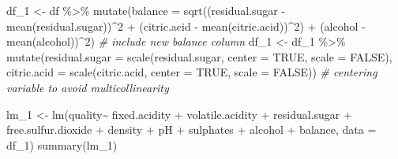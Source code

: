 \documentclass[
]{article}
\newenvironment{Shaded}{\begin{snugshade}}{\end{snugshade}}
\newcommand{\AttributeTok}[1]{\textcolor[rgb]{0.77,0.63,0.00}{#1}}
\newcommand{\CommentTok}[1]{\textcolor[rgb]{0.56,0.35,0.01}{\textit{#1}}}
\newcommand{\ConstantTok}[1]{\textcolor[rgb]{0.00,0.00,0.00}{#1}}
\newcommand{\DecValTok}[1]{\textcolor[rgb]{0.00,0.00,0.81}{#1}}
\newcommand{\FunctionTok}[1]{\textcolor[rgb]{0.00,0.00,0.00}{#1}}
\newcommand{\NormalTok}[1]{#1}
\newcommand{\OtherTok}[1]{\textcolor[rgb]{0.56,0.35,0.01}{#1}}
\newcommand{\SpecialCharTok}[1]{\textcolor[rgb]{0.00,0.00,0.00}{#1}}
\begin{document}
\begin{Shaded}
\begin{Highlighting}[]
\NormalTok{df\_1 }\OtherTok{\textless{}{-}}\NormalTok{ df }\SpecialCharTok{\%\textgreater{}\%} \FunctionTok{mutate}\NormalTok{(}\AttributeTok{balance =} \FunctionTok{sqrt}\NormalTok{((residual.sugar }\SpecialCharTok{{-}} \FunctionTok{mean}\NormalTok{(residual.sugar))}\SpecialCharTok{\^{}}\DecValTok{2} \SpecialCharTok{+}\NormalTok{ (citric.acid }\SpecialCharTok{{-}} \FunctionTok{mean}\NormalTok{(citric.acid))}\SpecialCharTok{\^{}}\DecValTok{2}\NormalTok{) }\SpecialCharTok{+}\NormalTok{ (alcohol }\SpecialCharTok{{-}} \FunctionTok{mean}\NormalTok{(alcohol))}\SpecialCharTok{\^{}}\DecValTok{2}\NormalTok{)  }\CommentTok{\# include new \textquotesingle{}balance\textquotesingle{} column}
\NormalTok{df\_1 }\OtherTok{\textless{}{-}}\NormalTok{ df\_1 }\SpecialCharTok{\%\textgreater{}\%} \FunctionTok{mutate}\NormalTok{(}\AttributeTok{residual.sugar =} \FunctionTok{scale}\NormalTok{(residual.sugar, }\AttributeTok{center =} \ConstantTok{TRUE}\NormalTok{, }\AttributeTok{scale =} \ConstantTok{FALSE}\NormalTok{), }\AttributeTok{citric.acid =} \FunctionTok{scale}\NormalTok{(citric.acid, }\AttributeTok{center =} \ConstantTok{TRUE}\NormalTok{, }\AttributeTok{scale =} \ConstantTok{FALSE}\NormalTok{))  }\CommentTok{\# centering variable to avoid multicollinearity}

\NormalTok{lm\_1 }\OtherTok{\textless{}{-}} \FunctionTok{lm}\NormalTok{(quality}\SpecialCharTok{\textasciitilde{}}\NormalTok{ fixed.acidity }\SpecialCharTok{+}\NormalTok{ volatile.acidity }\SpecialCharTok{+}\NormalTok{ residual.sugar }\SpecialCharTok{+}\NormalTok{ free.sulfur.dioxide }\SpecialCharTok{+}\NormalTok{ density }\SpecialCharTok{+}\NormalTok{ pH }\SpecialCharTok{+}\NormalTok{ sulphates }\SpecialCharTok{+}\NormalTok{ alcohol }\SpecialCharTok{+}\NormalTok{ balance, }\AttributeTok{data =}\NormalTok{ df\_1)}
\FunctionTok{summary}\NormalTok{(lm\_1)}
\end{Highlighting}
\end{Shaded}
\end{document}
